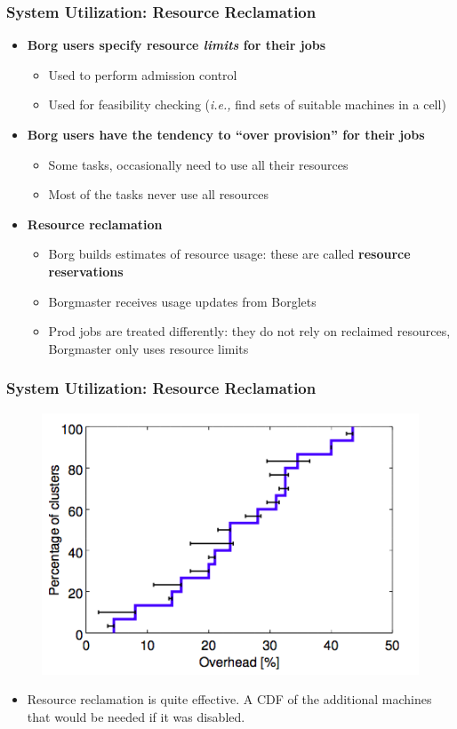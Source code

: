 \begin{frame}
\frametitle{System Utilization: Resource Reclamation}
\begin{itemize}
	\item {\bf Borg users specify resource {\it limits} for their jobs}
	\begin{itemize}
		\item Used to perform admission control
		\item Used for feasibility checking ({\it i.e.,} find sets of suitable machines in a cell)
	\end{itemize}
	\item {\bf Borg users have the tendency to ``over provision'' for their jobs}
	\begin{itemize}
		\item Some tasks, occasionally need to use all their resources
		\item Most of the tasks never use all resources
	\end{itemize}
	\item {\bf Resource reclamation}
	\begin{itemize}
		\item Borg builds estimates of resource usage: these are called {\bf resource reservations}
		\item Borgmaster receives usage updates from Borglets
		\item Prod jobs are treated differently: they do not rely on reclaimed resources, Borgmaster only uses resource limits
	\end{itemize}
\end{itemize}
\end{frame}

\begin{frame}
\frametitle{System Utilization: Resource Reclamation}
\begin{figure}[h]
  \centering
  \includegraphics[scale=0.4]{./figures/borg_exp_reclamation1}
  \label{fig:borg_exp_reclamation1}
\end{figure}
\begin{itemize}
	\item Resource reclamation is quite effective. A CDF of the additional machines that would be needed if it was disabled.
\end{itemize}
\end{frame}

